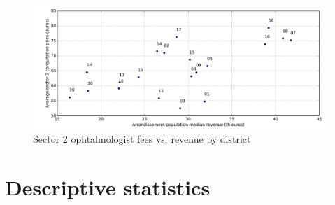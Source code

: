 \documentclass[11pt]{article}
\begin{document}
\begin{figure}[H]
    \caption{Sector 2 ophtalmologist fees vs. revenue by district}
		\label{fig:Ophtalmo_s2_fees}
	\centering
		\includegraphics[width=16cm]{images/Ophtalmo_Ardt_ConsultationS2VsRevenue.png}
\end{figure}

\clearpage

\appendix

\section{Descriptive statistics}
\end{document}
